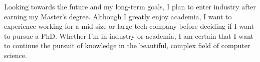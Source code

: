 \documentclass[11pt]{article}
\begin{document}
Looking towards the future and my long-term goals, I plan to enter industry after earning my Master's degree. Although I greatly enjoy academia, I want to experience working for a mid-size or large tech company before deciding if I want to pursue a PhD. Whether I'm in industry or academia, I am certain that I want to continue the pursuit of knowledge in the beautiful, complex field of computer science.\\
\end{document}
